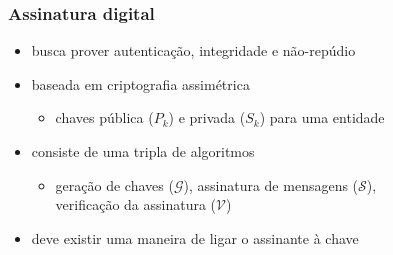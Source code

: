 \documentclass{beamer}
\newcommand{\concat}{\, \vert \vert \,}
\begin{document}
\begin{frame}
  \frametitle{Assinatura digital}
  \begin{itemize}
    \item busca prover autenticação, integridade e não-repúdio
    \item baseada em criptografia assimétrica
    \begin{itemize}
      \item chaves pública ($P_{k}$) e privada ($S_{k}$) para uma entidade
    \end{itemize}
    \item consiste de uma tripla de algoritmos \cite{Goldreich2004}
    \begin{itemize}
      \item geração de chaves ($\mathcal{G}$),
          assinatura de mensagens ($\mathcal{S}$), \\
          verificação da assinatura ($\mathcal{V}$)
    \end{itemize}
    \item deve existir uma maneira de ligar o assinante à chave
  \end{itemize}

  \begin{figure}
  \end{figure}
\end{frame}
\end{document}
